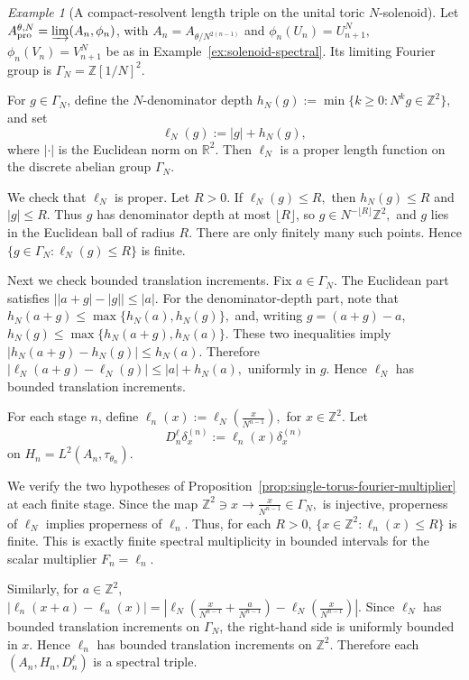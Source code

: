 \documentclass[11pt]{amsart}
\theoremstyle{definition}
\theoremstyle{remark}
\newtheorem{example}[theorem]{Example}
\newcommand{\Z}{\mathbb{Z}}
\newcommand{\R}{\mathbb{R}}
\newcommand{\ex}{\mathrm{pro}}
\begin{document}
\begin{example}[A compact-resolvent length triple on the unital toric \(N\)-solenoid]
\label{ex:compact-resolvent-solenoid-dirac} Let $A_{\ex}^{\theta,N}=\varinjlim(A_n,\phi_n)$, with $A_n=A_{\theta/N^{2(n-1)}}$ and 
$\phi_n(U_n)=U_{n+1}^N,$ $\phi_n(V_n)=V_{n+1}^N$
 be as in Example~\ref{ex:solenoid-spectral}. Its
limiting Fourier group is $\Gamma_N=\Z[1/N]^2.$

For $g\in\Gamma_N$, define the $N$-denominator depth $h_N(g):=\min\{k\geq0 : N^kg\in\Z^2\},
$
and set
\[
\ell_N(g):=|g|+h_N(g),
\]
where $|\cdot|$ is the Euclidean norm on $\R^2$.  Then $\ell_N$ is a
proper length function on the discrete abelian group $\Gamma_N$.



We check that $\ell_N$ is proper. Let $R>0$. If $\ell_N(g)\leq R,$
then $h_N(g)\leq R$ and $|g|\leq R.$ Thus $g$ has denominator depth at most $\lfloor R\rfloor$, so $g\in N^{-\lfloor R\rfloor}\Z^2,$
and $g$ lies in the Euclidean ball of radius $R$. There are only finitely
many such points. Hence $\{g\in\Gamma_N:\ell_N(g)\leq R\}$
is finite.

Next we check bounded translation increments. Fix \(a\in\Gamma_N\). The
Euclidean part satisfies $\bigl||a+g|-|g|\bigr|\leq |a|.$
For the denominator-depth part, note that $h_N(a+g)\leq \max\{h_N(a),h_N(g)\},$
and, writing $g=(a+g)-a$, $h_N(g)\leq \max\{h_N(a+g),h_N(a)\}.$
These two inequalities imply $|h_N(a+g)-h_N(g)|\leq h_N(a).$
Therefore $|\ell_N(a+g)-\ell_N(g)|\leq|a|+h_N(a),$
uniformly in $g$. Hence $\ell_N$ has bounded translation increments.

For each stage $n$, define $\ell_n(x):=\ell_N\left(\frac{x}{N^{n-1}}\right),$ for 
$ x\in\Z^2.$ Let
\[
D_n^\ell\delta_x^{(n)}:=\ell_n(x)\delta_x^{(n)}
\]
on $H_n=L^2(A_n,\tau_{\theta_n}).$

We verify the two hypotheses of
Proposition~\ref{prop:single-torus-fourier-multiplier} at each finite stage.
Since the map $\Z^2\ni x\to  \frac{x}{N^{n-1}}\in\Gamma_N,$ is injective, properness of $\ell_N$ implies properness of $\ell_n$. Thus,
for each $R>0$, $\{x\in\Z^2:\ell_n(x)\leq R\}$ is finite. This is exactly finite spectral multiplicity in bounded intervals
for the scalar multiplier $F_n=\ell_n$.

Similarly, for $a\in\Z^2$,
$
|\ell_n(x+a)-\ell_n(x)|=\left|
\ell_N\left(\frac{x}{N^{n-1}}+\frac{a}{N^{n-1}}\right)
-
\ell_N\left(\frac{x}{N^{n-1}}\right)\right|.$
Since $\ell_N$ has bounded translation increments on $\Gamma_N$, the
right-hand side is uniformly bounded in $x$. Hence $\ell_n$ has bounded
translation increments on $\Z^2$. Therefore each $(A_n,H_n,D_n^\ell)$
is a spectral triple.


\end{example}
\end{document}

